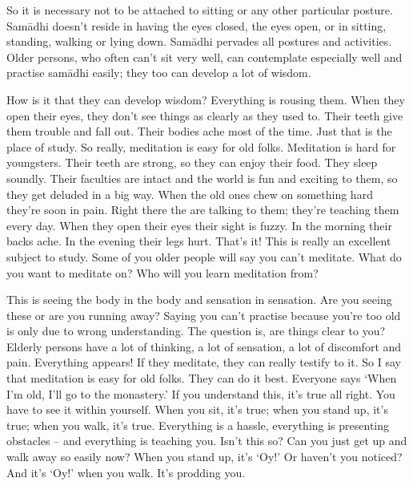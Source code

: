 So it is necessary not to be attached to sitting or any other particular posture. Sam\=adhi doesn't reside in having the eyes closed, the eyes open, or in sitting, standing, walking or lying down. Sam\=adhi pervades all postures and activities. Older persons, who often can't sit very well, can contemplate especially well and practise sam\=adhi easily; they too can develop a lot of wisdom.

How is it that they can develop wisdom? Everything is rousing them. When they open their eyes, they don't see things as clearly as they used to. Their teeth give them trouble and fall out. Their bodies ache most of the time. Just that is the place of study. So really, meditation is easy for old folks. Meditation is hard for youngsters. Their teeth are strong, so they can enjoy their food. They sleep soundly. Their faculties are intact and the world is fun and exciting to them, so they get deluded in a big way. When the old ones chew on something hard they're soon in pain. Right there the  are talking to them; they're teaching them every day. When they open their eyes their sight is fuzzy. In the morning their backs ache. In the evening their legs hurt. That's it! This is really an excellent subject to study. Some of you older people will say you can't meditate. What do you want to meditate on? Who will you learn meditation from?

This is seeing the body in the body and sensation in sensation. Are you seeing these or are you running away? Saying you can't practise because you're too old is only due to wrong understanding. The question is, are things clear to you? Elderly persons have a lot of thinking, a lot of sensation, a lot of discomfort and pain. Everything appears! If they meditate, they can really testify to it. So I say that meditation is easy for old folks. They can do it best. Everyone says `When I'm old, I'll go to the monastery.' If you understand this, it's true all right. You have to see it within yourself. When you sit, it's true; when you stand up, it's true; when you walk, it's true. Everything is a hassle, everything is presenting obstacles -- and everything is teaching you. Isn't this so? Can you just get up and walk away so easily now? When you stand up, it's `Oy!' Or haven't you noticed? And it's `Oy!' when you walk. It's prodding you.

